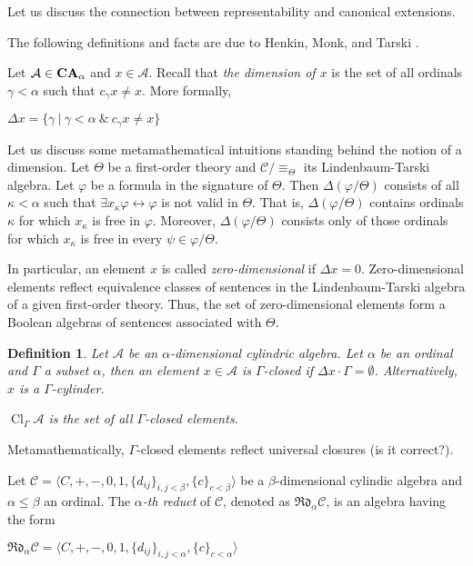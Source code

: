 \documentclass[a4paper]{article}
\theoremstyle{defin}
\newtheorem{defin}{Definition}
\theoremstyle{theorem}
\theoremstyle{prop}
\theoremstyle{lemma}
\theoremstyle{fact}
\theoremstyle{ex}
\theoremstyle{col}
\begin{document}
Let us discuss the connection between representability and canonical extensions.

The following definitions and facts are due to Henkin, Monk, and Tarski \cite{henkin1971cylindric}.

Let $\mathcal{A} \in {\bf CA}_{\alpha}$ and $x \in \mathcal{A}$. Recall that \emph{the dimension of $x$}
is the set of all ordinals $\gamma < \alpha$ such that $c_\gamma x \neq x$. More formally,
\begin{center}
  $\Delta x = \{ \gamma \: | \: \gamma < \alpha \: \& \: c_\gamma x \neq x\}$
\end{center}

Let us discuss some metamathematical intuitions standing behind the notion of a dimension. Let $\Theta$ be a first-order theory and $\mathcal{C}/\equiv_{\Theta}$ its Lindenbaum-Tarski algebra. Let $\varphi$ be a formula in the signature of $\Theta$. Then $\Delta(\varphi/\Theta)$ consists of all $\kappa < \alpha$ such that $\exists x_{\kappa} \varphi \leftrightarrow \varphi$ is not valid in $\Theta$.
That is, $\Delta(\varphi/\Theta)$ contains ordinals $\kappa$ for which $x_{\kappa}$ is free in $\varphi$. Moreover, $\Delta(\varphi/\Theta)$ consists only of those ordinals for which $x_{\kappa}$ is free in every $\psi \in \varphi/\Theta$.

In particular, an element $x$ is called \emph{zero-dimensional} if $\Delta x = 0$. Zero-dimensional elements reflect equivalence classes of sentences in the Lindenbaum-Tarski algebra of a given first-order theory. Thus, the set of zero-dimensional elements form a Boolean algebras of sentences associated with $\Theta$.

\begin{defin}
  Let $\mathcal{A}$ be an $\alpha$-dimensional cylindric algebra. Let $\alpha$ be an ordinal and $\Gamma$ a subset $\alpha$, then an element $x \in \mathcal{A}$ is $\Gamma$-closed if $\Delta x \cdot \Gamma = \emptyset$. Alternatively, $x$ is a $\Gamma$-cylinder.

 $\operatorname{Cl}_{\Gamma}\mathcal{A}$ is the set of all $\Gamma$-closed elements.
\end{defin}

Metamathematically, $\Gamma$-closed elements reflect universal closures (is it correct?).

Let $\mathcal{C} = \langle C, +, -, 0, 1, \{d_{ij}\}_{i, j < \beta}, \{ c \}_{c < \beta} \rangle$ be a $\beta$-dimensional cylindic algebra and $\alpha \leq \beta$ an ordinal. The \emph{$\alpha$-th reduct} of $\mathcal{C}$, denoted as $\mathfrak{R}\mathfrak{d}_{\alpha}\mathcal{C}$, is an algebra having the form
\begin{center}
$\mathfrak{R}\mathfrak{d}_{\alpha}\mathcal{C} = \langle C, +, -, 0, 1, \{d_{ij}\}_{i, j < \alpha}, \{ c \}_{c < \alpha} \rangle$
\end{center}
\end{document}
